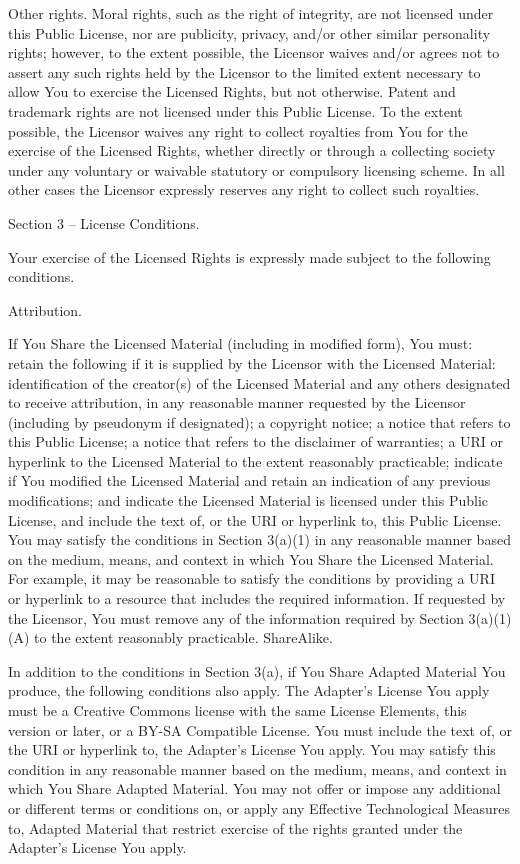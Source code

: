     Other rights.
        Moral rights, such as the right of integrity, are not licensed under this Public License, nor are publicity, privacy, and/or other similar personality rights; however, to the extent possible, the Licensor waives and/or agrees not to assert any such rights held by the Licensor to the limited extent necessary to allow You to exercise the Licensed Rights, but not otherwise.
        Patent and trademark rights are not licensed under this Public License.
        To the extent possible, the Licensor waives any right to collect royalties from You for the exercise of the Licensed Rights, whether directly or through a collecting society under any voluntary or waivable statutory or compulsory licensing scheme. In all other cases the Licensor expressly reserves any right to collect such royalties.

Section 3 – License Conditions.

Your exercise of the Licensed Rights is expressly made subject to the following conditions.

    Attribution.

        If You Share the Licensed Material (including in modified form), You must:
            retain the following if it is supplied by the Licensor with the Licensed Material:
                identification of the creator(s) of the Licensed Material and any others designated to receive attribution, in any reasonable manner requested by the Licensor (including by pseudonym if designated);
                a copyright notice;
                a notice that refers to this Public License;
                a notice that refers to the disclaimer of warranties;
                a URI or hyperlink to the Licensed Material to the extent reasonably practicable;
            indicate if You modified the Licensed Material and retain an indication of any previous modifications; and
            indicate the Licensed Material is licensed under this Public License, and include the text of, or the URI or hyperlink to, this Public License.
        You may satisfy the conditions in Section 3(a)(1) in any reasonable manner based on the medium, means, and context in which You Share the Licensed Material. For example, it may be reasonable to satisfy the conditions by providing a URI or hyperlink to a resource that includes the required information.
        If requested by the Licensor, You must remove any of the information required by Section 3(a)(1)(A) to the extent reasonably practicable.
    ShareAlike.

    In addition to the conditions in Section 3(a), if You Share Adapted Material You produce, the following conditions also apply.
        The Adapter’s License You apply must be a Creative Commons license with the same License Elements, this version or later, or a BY-SA Compatible License.
        You must include the text of, or the URI or hyperlink to, the Adapter's License You apply. You may satisfy this condition in any reasonable manner based on the medium, means, and context in which You Share Adapted Material.
        You may not offer or impose any additional or different terms or conditions on, or apply any Effective Technological Measures to, Adapted Material that restrict exercise of the rights granted under the Adapter's License You apply.

